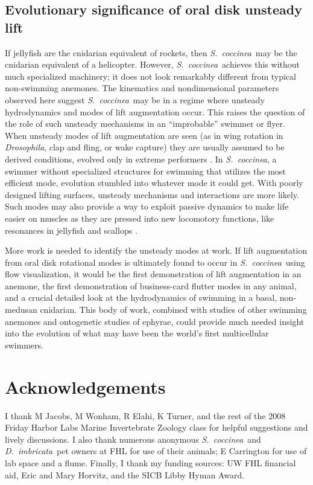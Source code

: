 \documentclass[10pt]{article}
\newcommand{\Genus}[1]{\emph{#1}}
\newcommand{\Stomphia}{\Genus{S.~coccinea}}
\newcommand{\Dermasterias}{\Genus{D.~imbricata}}
\begin{document}
\subsection*{Evolutionary significance of oral disk unsteady lift}
	If jellyfish are the cnidarian equivalent of rockets, then \Stomphia\ may be the cnidarian equivalent of a helicopter.  However, \Stomphia\ achieves this without much specialized machinery; it does not look remarkably different from typical non-swimming anemones.  The kinematics and nondimensional parameters observed here suggest \Stomphia\ may be in a regime where unsteady hydrodynamics and modes of lift augmentation occur.  This raises the question of the role of such unsteady mechanisms in an ``improbable'' swimmer or flyer.  When unsteady modes of lift augmentation are seen (as in wing rotation in \Genus{Drosophila}, clap and fling, or wake capture) they are usually assumed to be derived conditions, evolved only in extreme performers \citep{Dickinson:1996}.  In \Stomphia, a swimmer without specialized structures for swimming that utilizes the most efficient mode, evolution stumbled into whatever mode it could get.  With poorly designed lifting surfaces, unsteady mechanisms and interactions are more likely.   Such modes may also provide a way to exploit passive dynamics to make life easier on muscles as they are pressed into new locomotory functions, like resonances in jellyfish and scallops \citep{Demont:1988, Cheng:1996}.
	
	More work is needed to identify the unsteady modes at work.  If lift augmentation from oral disk rotational modes is ultimately found to occur in \Stomphia\ using flow visualization, it would be the first demonstration of lift augmentation in an anemone, the first demonstration of business-card flutter modes in any animal, and a crucial detailed look at the hydrodynamics of swimming in a basal, non-medusan cnidarian.  This body of work, combined with studies of other swimming anemones and ontogenetic studies of ephyrae, could provide much needed insight into the evolution of what may have been the world's first multicellular swimmers.  


\section*{Acknowledgements}
I thank M Jacobs, M Wonham, R Elahi, K Turner, and the rest of the 2008 Friday Harbor Labs Marine Invertebrate Zoology class for helpful suggestions and lively discussions.  I also thank numerous anonymous \Stomphia\ and \Dermasterias\ pet owners at FHL for use of their animals; E Carrington for use of lab space and a flume.  Finally, I thank my funding sources: UW FHL financial aid, Eric and Mary Horvitz, and the SICB Libby Hyman Award.


\end{document}
